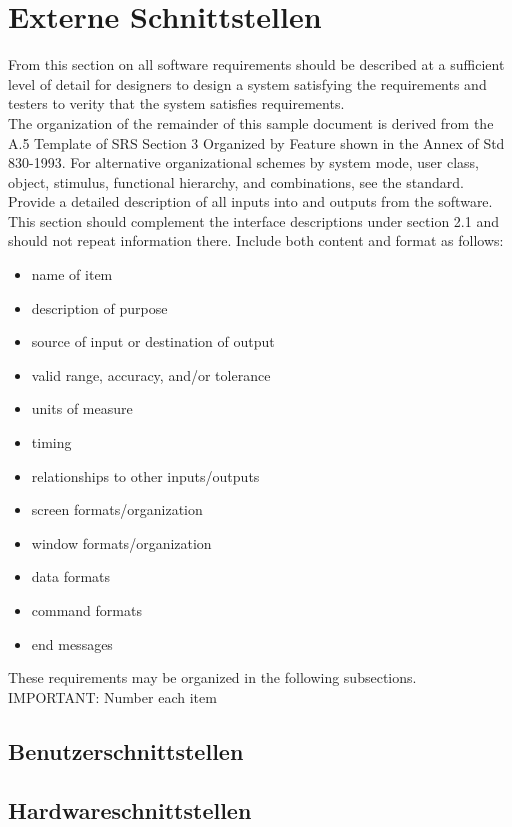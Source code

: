 \section{Externe Schnittstellen}
From this section on all software requirements should be described at a sufficient level of detail for designers to design a system satisfying the requirements and testers to verity that the system satisfies requirements. \\[-0.3cm]

\noindent The organization of the remainder of this sample document is derived from the A.5 Template of SRS Section 3 Organized by Feature shown in the Annex of Std 830-1993. For alternative organizational schemes by system mode, user class, object, stimulus, functional hierarchy, and combinations, see the standard. \\[-0.3cm]

\noindent Provide a detailed description of all inputs into and outputs from the software. This section should complement the interface descriptions under section 2.1 and should not repeat information there. Include both content and format as follows:
\begin{itemize}
	\item name of item
	\item description of purpose
	\item source of input or destination of output
	\item valid range, accuracy, and/or tolerance
	\item units of measure
	\item timing
	\item relationships to other inputs/outputs
	\item screen formats/organization
	\item window formats/organization
	\item data formats
	\item command formats
	\item end messages
\end{itemize}

\noindent These requirements may be organized in the following subsections. \\[0.1cm]
IMPORTANT: Number each item

\subsection{Benutzerschnittstellen}

\subsection{Hardwareschnittstellen}

